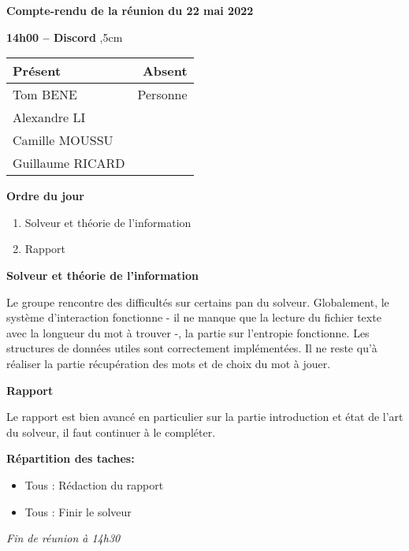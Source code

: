 \documentclass[12pt,a4paper,final]{report}
\begin{document}
\begin{center}
\Large \textbf{Compte-rendu de la réunion du 22 mai 2022}
\end{center}
\textbf{14h00 -- Discord}
,5cm

\begin{center}
\begin{tabular}{|l|r|}
    \hline
    Présent & Absent \\
    \hline
    Tom BENE & Personne \\
    Alexandre LI & \\
    Camille MOUSSU & \\
    Guillaume RICARD  & \\
    \hline
\end{tabular}
\end{center}

\begin{flushleft}
    \textbf{Ordre du jour}
\end{flushleft}

\begin{enumerate}
	\item Solveur et théorie de l'information 
	\item Rapport
\end{enumerate}

\begin{flushleft}
    \textbf{Solveur et théorie de l'information }
\end{flushleft}

Le groupe rencontre des difficultés sur certains pan du solveur. Globalement, le système d'interaction fonctionne - il ne manque que la lecture du fichier texte avec la longueur du mot à trouver -, la partie sur l'entropie fonctionne. Les structures de données utiles sont correctement implémentées. 
Il ne reste qu'à réaliser la partie récupération des mots et de choix du mot à jouer. 

\begin{flushleft}
    \textbf{Rapport}
\end{flushleft}
Le rapport est bien avancé en particulier sur la partie introduction et état de l'art du solveur, il faut continuer à le compléter.


\begin{flushleft}
    \textbf{Répartition des taches:}
\end{flushleft}
\begin{itemize}
    \item Tous : Rédaction du rapport
    \item Tous : Finir le solveur
\end{itemize}

\textit{Fin de réunion à 14h30}
\end{document}
